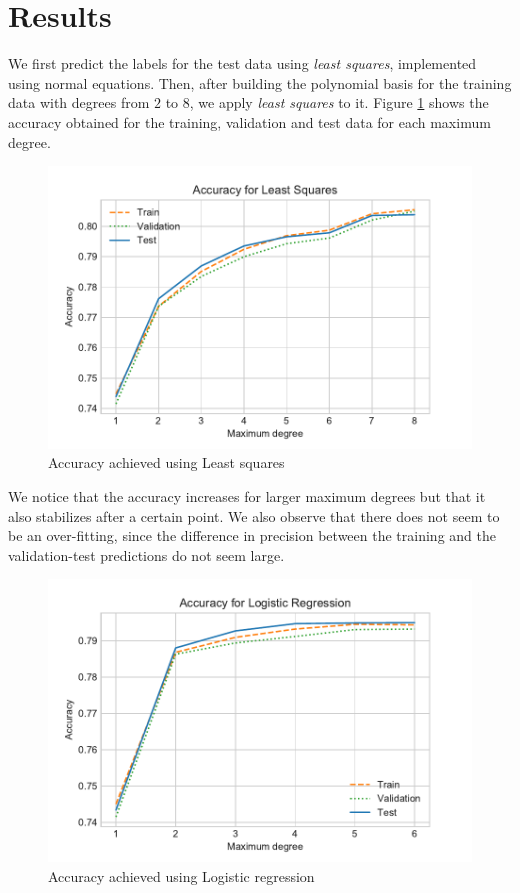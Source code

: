 \documentclass[10pt,conference,compsocconf]{IEEEtran}
\begin{document}
\section{Results}
\label{sec:results}
    We first predict the labels for the test data using \textit{least squares}, implemented using normal equations. Then, after building the polynomial basis for the training data with degrees from $2$ to $8$, we apply \textit{least squares} to it. Figure \ref{fig:LSprec} shows the accuracy obtained for the training, validation and test data for each maximum degree.

    \begin{figure}[htp]
      \centering
      \includegraphics[width=.45\textwidth,trim={0 .3cm 0 .7cm},clip]{LSprec}
      \caption{Accuracy achieved using Least squares}
      \label{fig:LSprec}
    \end{figure}


    We notice that the accuracy increases for larger maximum degrees but that it also stabilizes after a certain point. We also observe that there does not seem to be an over-fitting, since the difference in precision between the training and the validation-test predictions do not seem large.

    \begin{figure}[htp]
      \centering
      \includegraphics[width=.45\textwidth,trim={0 .3cm 0 .7cm},clip]{LRprec}
      \caption{Accuracy achieved using Logistic regression}
      \label{fig:LRprec}
    \end{figure}
\end{document}
